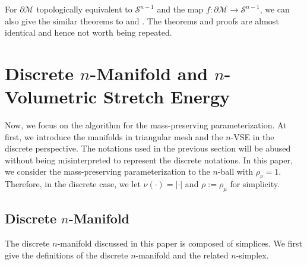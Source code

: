 \documentclass{article}
\begin{document}
\begin{remark}
For $\partial \mathcal{M}$ topologically equivalent to $\mathcal{S}^{n-1}$ and the map $f:\partial \mathcal{M} \to \mathcal{S}^{n-1}$, we can also give the similar theorems to  and . The theorems and proofs are almost identical and hence not worth being repeated.
\end{remark}


\section{Discrete $n$-Manifold and $n$-Volumetric Stretch Energy}

Now, we focus on the algorithm for the mass-preserving parameterization. At first, we introduce the manifolds in triangular mesh and the $n$-VSE in the discrete perspective. The notations used in the previous section will be abused without being misinterpreted to represent the discrete notations. In this paper, we consider the mass-preserving parameterization to the $n$-ball with $\rho_\nu = 1$. Therefore, in the discrete case, we let $\nu(\cdot) = |\cdot|$ and $\rho := \rho_\mu$ for simplicity.

\subsection{Discrete $n$-Manifold}

The discrete $n$-manifold discussed in this paper is composed of simplices. We first give the definitions of the discrete $n$-manifold and the related $n$-simplex.
\end{document}
